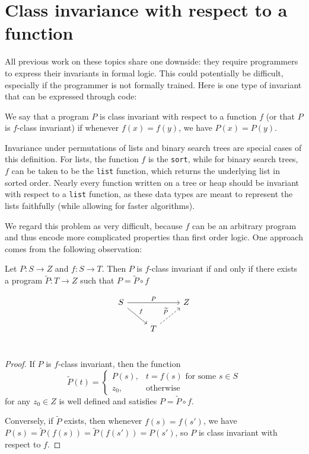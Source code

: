 \documentclass{llncs}
\begin{document}
  \section{Class invariance with respect to a function}

  All previous work on these topics share one downside: they require programmers
  to express their invariants in formal logic. 
  This could potentially be difficult,
  especially if the programmer is not formally trained.
  Here is one type of invariant that can be expressed through code:

  \begin{definition} We say that a program $P$ is class invariant with respect to a
    function $f$ (or that $P$ is $f$-class invariant)
    if whenever $f(x)=f(y)$, we have $P(x)=P(y)$.
  \end{definition}

  Invariance under permutations of lists and binary search trees are special
  cases of this definition.  For lists, the function \(f\) is the \verb!sort!,
  while for binary search trees, \(f\) can be taken to be the \verb!list!
  function, which returns the underlying list in sorted order.
  Nearly every function written on a tree or heap should be invariant with
  respect to a \verb!list! function, as these data types are meant to
  represent the lists faithfully (while allowing for faster algorithms).

  We regard this problem as very difficult, because $f$ can be
  an arbitrary program and thus encode more complicated properties than
  first order logic. One approach comes from the following observation:

  \begin{lemma} Let $P : S \to Z$ and $f : S \to T$.
    Then $P$ is $f$-class invariant if and only if
    there exists a program $\widetilde{P} : T\to Z$
    such that $P = \widetilde{P} \circ f$
  \end{lemma}
    \[
      \begin{tikzcd}
        S \arrow{rr}{P} \arrow{rd}{f} &   & Z \\
        & T \arrow[dashed]{ru}{\widetilde{P}} &   \\
      \end{tikzcd}
    \]
    \vspace{-0.3in}
  \begin{proof}
    If $P$ is $f$-class invariant, then the function
    \[ \widetilde{P}(t) = \begin{cases}
         P(s), & t = f(s) \text{ for some $s\in S$} \\
         z_0, & \text{otherwise}
       \end{cases}
    \]
    for any $z_0 \in Z$
    is well defined and satisfies $P = \widetilde{P} \circ f$.

    Conversely, if $\widetilde{P}$ exists, then whenever $f(s)=f(s')$,
    we have $P(s) = \widetilde{P}(f(s)) = \widetilde{P}(f(s')) = P(s')$,
    so $P$ is class invariant with respect to $f$.
  \end{proof}
\end{document}
